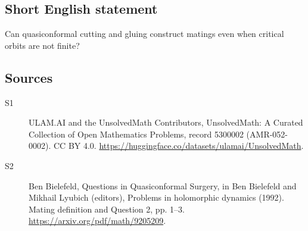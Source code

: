 \documentclass[11pt]{article}
\begin{document}
\subsection{Short English statement}
Can quasiconformal cutting and gluing construct matings even when critical orbits are not finite?
\subsection{Sources}
\begin{description}
\item[\hypertarget{source:5300002:1}{S1}] ULAM.AI and the UnsolvedMath Contributors, UnsolvedMath: A Curated Collection of Open Mathematics Problems, record 5300002 (AMR-052-0002). CC BY 4.0. \url{https://huggingface.co/datasets/ulamai/UnsolvedMath}.
\item[\hypertarget{source:5300002:2}{S2}] Ben Bielefeld, Questions in Quasiconformal Surgery, in Ben Bielefeld and Mikhail Lyubich (editors), Problems in holomorphic dynamics (1992). Mating definition and Question 2, pp. 1–3. \url{https://arxiv.org/pdf/math/9205209}.
\end{description}
\label{end:5300002}
\end{document}
